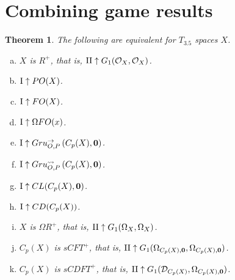 \documentclass[11pt]{article}
\theoremstyle{plain}
\newtheorem{theorem}{Theorem}
\theoremstyle{definition}
\theoremstyle{remark}
\theoremstyle{plain}
\theoremstyle{definition}
\theoremstyle{remark}
\begin{document}
\section{Combining game results}

\begin{theorem}
The following are equivalent for \(T_{3.5}\) spaces \(X\).
\begin{enumerate}[a)]
\item \(X\) is \(R^+\), that is, \(\mathrm{II}\uparrow G_{1}(\mathcal{O}_X,\mathcal{O}_X)\).
\item \(\mathrm{I}\uparrow PO(X)\). 
\item \(\mathrm{I}\uparrow FO(X)\).
\item \(\mathrm{I}\uparrow\Omega FO(x)\).
\item \(\mathrm{I}\uparrow Gru_{O,P}^{\to}\left({C_p(X)},{\mathbf 0}\right)\).
\item \(\mathrm{I}\uparrow Gru_{O,P}^{\leadsto}\left({C_p(X)},{\mathbf 0}\right)\).
\item \(\mathrm{I}\uparrow CL(C_p(X),\mathbf 0)\).
\item \(\mathrm{I}\uparrow CD(C_p(X))\).
\item \(X\) is \(\Omega R^+\), that is, 
  \(\mathrm{II}\uparrow G_{1}(\Omega_X,\Omega_X)\).
\item \(C_p(X)\) is \(sCFT^+\), that is, 
  \(\mathrm{II}\uparrow G_{1}(\Omega_{C_p(X),\mathbf 0},\Omega_{C_p(X),\mathbf 0})\).
\item \(C_p(X)\) is \(sCDFT^+\), that is,
  \(\mathrm{II}\uparrow G_{1}(\mathcal{D}_{C_p(X)},\Omega_{C_p(X),\mathbf 0})\).
\end{enumerate}
\end{theorem}
\end{document}
